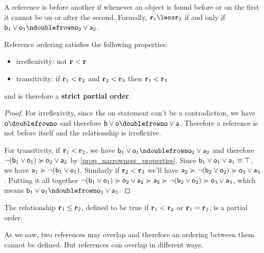 \documentclass[11pt,letterpaper,fleqn]{memoir} %
\begin{document}
\begin{mathSection}
\begin{defn}
	A reference is before another if whenever an object is found before or on the first it cannot be on or after the second. Formally, $\refStmt_1 \less \refStmt_2$ if and only if $\stmt[b]_1 \OR \stmt[o]_1 \ncomp \stmt[o]_2 \OR \stmt[a]_2$.
\end{defn}
\begin{prop}
	Reference ordering satisfies the following properties:
	\begin{itemize}
		\item irreflexivity: not $\refStmt < \refStmt$
		\item transitivity: if $\refStmt_1 < \refStmt_2$ and $\refStmt_2 < \refStmt_3$ then $\refStmt_1 < \refStmt_3$
	\end{itemize}
	and is therefore a \textbf{strict partial order}.
\end{prop}
\begin{proof}
	For irreflexivity, since the on statement can't be a contradiction, we have $\stmt[o] \comp \stmt[o]$ and therefore $\stmt[b] \OR \stmt[o] \comp \stmt[o] \OR \stmt[a]$. Therefore a reference is not before itself and the relationship is irreflexive.
	
	For transitivity, if $\refStmt_1 < \refStmt_2$, we have $\stmt[b]_1 \OR \stmt[o]_1 \ncomp \stmt[o]_2 \OR \stmt[a]_2$ and therefore $\NOT (\stmt[b]_1 \OR \stmt[o]_1) \broader \stmt[o]_2 \OR \stmt[a]_2$ by \ref{prop_narrowness_properties}. Since $\stmt[b]_1 \OR \stmt[o]_1 \OR \stmt[a]_1 \equiv \tautology$, we have $\stmt[a]_1 \broader \NOT (\stmt[b]_1 \OR \stmt[o]_1)$. Similarly if $\refStmt_2 < \refStmt_3$ we'll have $\stmt[a]_2 \broader \NOT (\stmt[b]_2 \OR \stmt[o]_2) \broader \stmt[o]_3 \OR \stmt[a]_3$. Putting it all together $\NOT (\stmt[b]_1 \OR \stmt[o]_1) \broader \stmt[o]_2 \OR \stmt[a]_2 \broader \stmt[a]_2 \broader \NOT (\stmt[b]_2 \OR \stmt[o]_2) \broader \stmt[o]_3 \OR \stmt[a]_3$, which means $\stmt[b]_1 \OR \stmt[o]_1 \ncomp \stmt[o]_3 \OR \stmt[a]_3$.
\end{proof}
\begin{coro}
	The relationship $\refStmt_1 \leq \refStmt_2$, defined to be true if $\refStmt_1 < \refStmt_2$ or $\refStmt_1 = \refStmt_2$, is a partial order.
\end{coro}
\end{mathSection}

As we saw, two references may overlap and therefore an ordering between them cannot be defined. But references can overlap in different ways.
\end{document}
